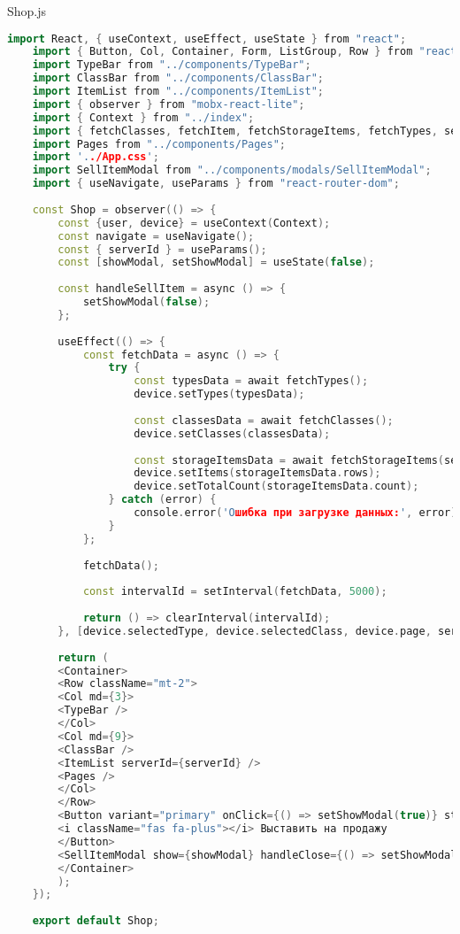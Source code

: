Shop.js
\begin{lstlisting}[language=C++]
	import React, { useContext, useEffect, useState } from "react";
	import { Button, Col, Container, Form, ListGroup, Row } from "react-bootstrap";
	import TypeBar from "../components/TypeBar";
	import ClassBar from "../components/ClassBar";
	import ItemList from "../components/ItemList";
	import { observer } from "mobx-react-lite";
	import { Context } from "../index";
	import { fetchClasses, fetchItem, fetchStorageItems, fetchTypes, searchItemByName } from "../http/ItemAPI";
	import Pages from "../components/Pages";
	import '../App.css';
	import SellItemModal from "../components/modals/SellItemModal";
	import { useNavigate, useParams } from "react-router-dom";
	
	const Shop = observer(() => {
		const {user, device} = useContext(Context);
		const navigate = useNavigate();
		const { serverId } = useParams();
		const [showModal, setShowModal] = useState(false);
		
		const handleSellItem = async () => {
			setShowModal(false);
		};
		
		useEffect(() => {
			const fetchData = async () => {
				try {
					const typesData = await fetchTypes();
					device.setTypes(typesData);
					
					const classesData = await fetchClasses();
					device.setClasses(classesData);
					
					const storageItemsData = await fetchStorageItems(serverId, device.selectedType.id, device.selectedClass.id, device.page, 5);
					device.setItems(storageItemsData.rows);
					device.setTotalCount(storageItemsData.count);
				} catch (error) {
					console.error('Ошибка при загрузке данных:', error);
				}
			};
			
			fetchData();
			
			const intervalId = setInterval(fetchData, 5000);
			
			return () => clearInterval(intervalId);
		}, [device.selectedType, device.selectedClass, device.page, serverId]);
		
		return (
		<Container>
		<Row className="mt-2">
		<Col md={3}>
		<TypeBar />
		</Col>
		<Col md={9}>
		<ClassBar />
		<ItemList serverId={serverId} />
		<Pages />
		</Col>
		</Row>
		<Button variant="primary" onClick={() => setShowModal(true)} style={{ position: 'fixed', bottom: '20px', right: '20px' }}>
		<i className="fas fa-plus"></i> Выставить на продажу
		</Button>
		<SellItemModal show={showModal} handleClose={() => setShowModal(false)} handleSell={handleSellItem} serverId={serverId} />
		</Container>
		);
	});
	
	export default Shop;
\end{lstlisting}

